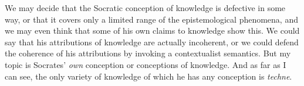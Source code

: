 ﻿\documentclass[11pt]{amsart}
\begin{document}
We may decide that the Socratic conception of knowledge is defective in some way, or that it covers only a limited range of the epistemological phenomena, and we may even think that some of his own claims to knowledge show this. We could say that his attributions of knowledge are actually incoherent, or we could defend the coherence of his attributions by invoking a contextualist semantics. But my topic is Socrates' \emph{own} conception or conceptions of knowledge. And as far as I can see, the only variety of knowledge of which he has any conception is \emph{techne}.













\end{document}
